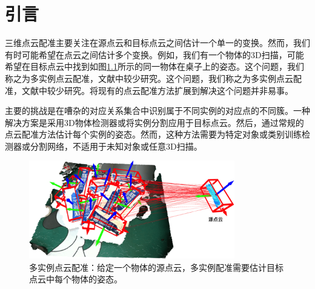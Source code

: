 %
%
%
%
%
%


\chapter{引言}

三维点云配准\cite{TEASER, DCP, paulj1992method}主要关注在源点云和目标点云之间估计一个单一的变换。然而，我们有时可能希望在点云之间估计多个变换。例如，我们有一个物体的3D扫描，可能希望在目标点云中找到如图\ref{fig:problem}所示的同一物体在桌子上的姿态。这个问题，我们称之为多实例点云配准，文献中较少研究。这个问题，我们称之为多实例点云配准，文献中较少研究。将现有的点云配准方法扩展到解决这个问题并非易事。

主要的挑战是在嘈杂的对应关系集合中识别属于不同实例的对应点的不同簇。一种解决方案是采用3D物体检测器或将实例分割应用于目标点云。然后，通过常规的点云配准方法估计每个实例的姿态。然而，这种方法需要为特定对象或类别训练检测器或分割网络\cite{VoteNet, Occuseg}，不适用于未知对象或任意3D扫描。

\begin{figure}[htbp]
  \centering
  \includegraphics[width=0.8\textwidth]{images/problem.png}
  \caption{多实例点云配准：给定一个物体的源点云，多实例配准需要估计目标点云中每个物体的姿态。}
  \label{fig:problem} %
  \vspace{-0.5in}
\end{figure}



